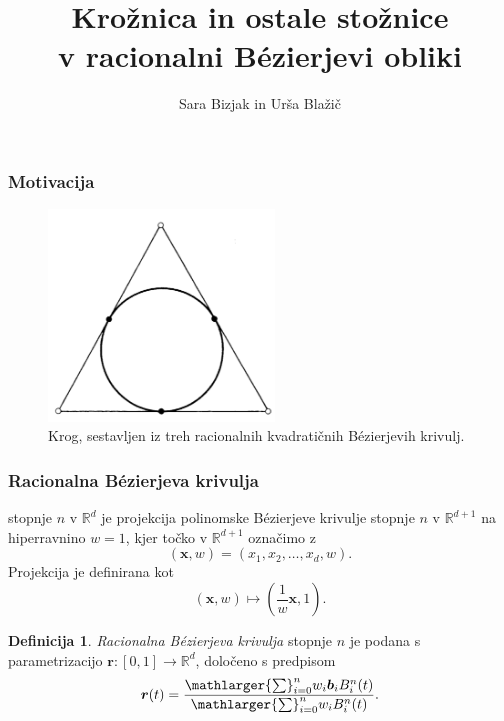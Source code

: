\documentclass[a4paper, 12pt]{beamer}
\title[CAGD projekt]{Krožnica in ostale stožnice \\
v racionalni B\'ezierjevi obliki
}
\author{Sara Bizjak in Urša Blažič}
\institute[FMF]{Fakulteta za matematiko in fiziko}
\theoremstyle{definition}
\newtheorem*{definicija}{Definicija}
\theoremstyle{plain}
\begin{document}
\titlepage


\begin{frame}
\frametitle{Motivacija}
    
\begin{figure}[ht!]
    \centering
    \includegraphics[width=60mm]{krog_po_delih.png}
    \caption{Krog, sestavljen iz treh racionalnih kvadratičnih B\'ezierjevih krivulj.}
    \label{slika:krogpodelih}
\end{figure}
    
    
\end{frame}


\begin{frame}
\frametitle{Racionalna B\'ezierjeva krivulja}
    
    stopnje $n$ v $\mathbb{R}^d$ je projekcija polinomske B\'ezierjeve krivulje stopnje $n$ v $\mathbb{R}^{d+1}$ na hiperravnino $w=1$, kjer točko v  $\mathbb{R}^{d+1}$  označimo z
    $$(\boldsymbol{x},w)=(x_1,x_2,\dots,x_d,w).$$
    Projekcija je definirana kot
    $$(\boldsymbol{x},w)\mapsto (\frac{1}{w}\boldsymbol{x},1).$$

    \begin{definicija}
        \emph{Racionalna B\'ezierjeva krivulja} stopnje $n$ je podana s parametrizacijo $\boldsymbol{r}:[0,1]\rightarrow \mathbb{R}^d$, določeno s predpisom
        $$\boldsymbol{r}(t)=\frac{\mathlarger{\sum}_{i=0}^n w_i\boldsymbol{b}_iB_i^n(t)}{\mathlarger{\sum}_{i=0}^n w_iB_i^n(t)}.$$      
    \end{definicija}

\end{frame}


\end{document}

